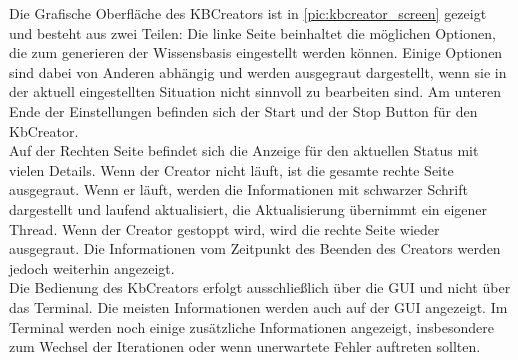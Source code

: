 \documentclass[12pt,a4paper]{article}
\begin{document}
Die Grafische Oberfläche des KBCreators ist in \autoref{pic:kbcreator_screen} gezeigt und besteht aus zwei Teilen: Die linke Seite beinhaltet die möglichen Optionen, die zum generieren der Wissensbasis eingestellt werden können. Einige Optionen sind dabei von Anderen abhängig und werden ausgegraut dargestellt, wenn sie in der aktuell eingestellten Situation nicht sinnvoll zu bearbeiten sind. Am unteren Ende der Einstellungen befinden sich der Start und der Stop Button für den KbCreator.\\
Auf der Rechten Seite befindet sich die Anzeige für den aktuellen Status mit vielen Details. Wenn der Creator nicht läuft, ist die gesamte rechte Seite ausgegraut. Wenn er läuft, werden die Informationen mit schwarzer Schrift dargestellt und laufend aktualisiert, die Aktualisierung übernimmt ein eigener Thread. Wenn der Creator gestoppt wird, wird die rechte Seite wieder ausgegraut. Die Informationen vom Zeitpunkt des Beenden des Creators werden jedoch weiterhin angezeigt. \\
Die Bedienung des KbCreators erfolgt ausschließlich über die GUI und nicht über das Terminal. Die meisten Informationen werden auch auf der GUI angezeigt. Im Terminal werden noch einige zusätzliche Informationen angezeigt, insbesondere zum Wechsel der Iterationen oder wenn unerwartete Fehler auftreten sollten.
\end{document}
